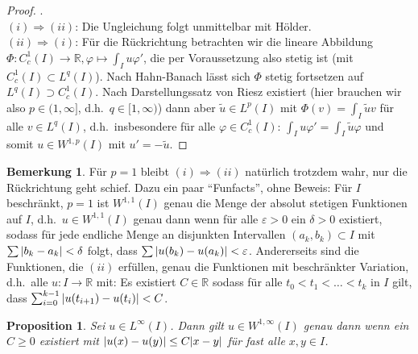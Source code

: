 \documentclass[twoside]{article}
\newtheorem{proposition}[theorem]{Proposition}
\theoremstyle{definition}
\newtheorem{remark}[theorem]{Bemerkung}
\begin{document}
\begin{proof}.\\
$(i) \Rightarrow (ii)$: Die Ungleichung folgt unmittelbar mit Hölder. \\
$(ii) \Rightarrow (i)$: Für die Rückrichtung betrachten wir die lineare Abbildung $\Phi:C_c^1(I) \to \mathbb{R}, \varphi \mapsto \int_I u \varphi'$, die per Voraussetzung also stetig ist (mit $C_c^1(I) \subset L^q(I)$). Nach Hahn-Banach lässt sich $\Phi$ stetig fortsetzen auf $L^q(I) \supset C_c^1(I)$. Nach Darstellungssatz von Riesz existiert (hier brauchen wir also $p \in (1,\infty]$, d.h.\ $q \in [1,\infty)$) dann aber $\tilde{u} \in L^p(I)$ mit $\Phi(v)= \int_I \tilde{u} v$ für alle $v \in L^q(I)$, d.h.\ insbesondere für alle $\varphi \in C_c^1(I)$: $\int_I u \varphi' = \int_I \tilde{u} \varphi$ und somit $u \in W^{1,p}(I)$ mit $u' = - \tilde{u}$.
\end{proof}
\begin{remark}
Für $p = 1$ bleibt $(i) \Rightarrow (ii)$ natürlich trotzdem wahr, nur die Rückrichtung geht schief. Dazu ein paar \enquote{Funfacts}, ohne Beweis: Für $I$ beschränkt, $p=1$ ist $W^{1,1}(I)$ genau die Menge der absolut stetigen Funktionen auf $I$, d.h.\ $u \in W^{1,1}(I)$ genau dann wenn für alle $\varepsilon > 0$ ein $\delta > 0$ existiert, sodass für jede endliche Menge an disjunkten Intervallen $(a_k,b_k) \subset I$ mit $\sum \abs{b_k - a_k} < \delta$ folgt, dass $\sum \abs{u(b_k)-u(a_k)}< \varepsilon$. Andererseits sind die Funktionen, die $(ii)$ erfüllen, genau die Funktionen mit beschränkter Variation, d.h.\ alle $u:I \to \mathbb{R}$ mit: Es existiert $C \in \mathbb{R}$ sodass für alle $t_0 < t_1 < \dots < t_k$ in $I$ gilt, dass $\sum_{i=0}^{k-1} \abs{u(t_{i+1})-u(t_i)}<C$.
\end{remark}
\begin{proposition} \label{prop:linfprop}
Sei $u \in L^\infty(I)$. Dann gilt $u \in W^{1,\infty}(I)$ genau dann wenn ein $C \geq 0$ existiert mit $\abs{u(x)-u(y)} \leq C \abs{x-y}$ für fast alle $x,y \in I$.
\end{proposition}
\end{document}
